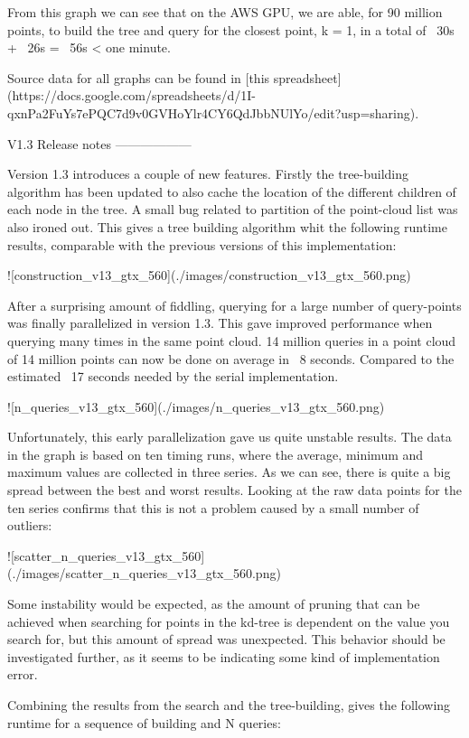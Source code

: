 From this graph we can see that on the AWS GPU, we are able, for 90 million points, to build the tree and query for the closest point, k = 1, in a total of ~30s + ~26s = ~56s < one minute.

Source data for all graphs can be found in [this spreadsheet](https://docs.google.com/spreadsheets/d/1I-qxnPa2FuYs7ePQC7d9v0GVHoYlr4CY6QdJbbNUlYo/edit?usp=sharing).



V1.3 Release notes
------------------

Version 1.3 introduces a couple of new features. Firstly the tree-building algorithm has been updated to also cache the location of the different children of each node in the tree. A small bug related to partition of the point-cloud list was also ironed out. This gives a tree building algorithm whit the following runtime results, comparable with the previous versions of this implementation:

![construction_v13_gtx_560](./images/construction_v13_gtx_560.png)

After a surprising amount of fiddling, querying for a large number of query-points was finally parallelized in version 1.3. This gave improved performance when querying many times in the same point cloud. 14 million queries in a point cloud of 14 million points can now be done on average in ~8 seconds. Compared to the estimated ~17 seconds needed by the serial implementation.

![n_queries_v13_gtx_560](./images/n_queries_v13_gtx_560.png)

Unfortunately, this early parallelization gave us quite unstable results. The data in the graph is based on ten timing runs, where the average, minimum and maximum values are collected in three series. As we can see, there is quite a big spread between the best and worst results. Looking at the raw data points for the ten series confirms that this is not a problem caused by a small number of outliers:

![scatter_n_queries_v13_gtx_560](./images/scatter_n_queries_v13_gtx_560.png)

Some instability would be expected, as the amount of pruning that can be achieved when searching for points in the kd-tree is dependent on the value you search for, but this amount of spread was unexpected. This behavior should be investigated further, as it seems to be indicating some kind of implementation error.

Combining the results from the search and the tree-building, gives the following runtime for a sequence of building and N queries:

